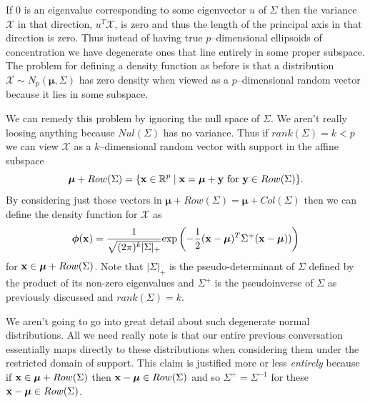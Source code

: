 \documentclass{book}
\newcommand{\bs}[1]{\boldsymbol{#1}}
\newcommand{\rv}[1]{\bs{\mathscr{#1}}}
\begin{document}
If $0$ is an eigenvalue corresponding to some eigenvector $u$ of $\Sigma$ then the variance $\rv{X}$ in that direction, $u^T\rv{X}$, is zero and thus the length of the principal axis in that direction is zero. Thus instead of having true $p$--dimensional ellipsoids of concentration we have degenerate ones that line entirely in some proper subspace. The problem for defining a density function as before is that a distribution $\rv{X}\sim N_p(\bs{\mu},\Sigma)$ has zero density when viewed as a $p$--dimensional random vector because it lies in some subspace.

We can remedy this problem by ignoring the null space of $\Sigma$. We aren't really loosing anything because $Nul(\Sigma)$ has no variance. Thus if $rank(\Sigma)=k<p$ we can view $\rv{X}$ as a $k$--dimensional random vector with support in the affine subspace 
$$
\bs{\mu}+Row(\Sigma)=\{{\bf x}\in\mathbb{R}^p \mid {\bf x}=\bs{\mu}+{\bf y}\text{ for }{\bf y}\in Row(\Sigma)\}.
$$
By considering just those vectors in $\bs{\mu}+Row(\Sigma)=\bs{\mu}+Col(\Sigma)$ then we can define the density function for $\rv{X}$ as
$$
\bs{\phi}({\bf x})=\frac{1}{\sqrt{(2\pi)^k|\Sigma|_+}}\text{exp}\left(-\frac{1}{2}({\bf x}-\bs{\mu})^T\Sigma^+({\bf x}-\bs{\mu}))\right)
$$
for ${\bf x}\in\bs{\mu}+Row(\Sigma)$. Note that $|\Sigma|_+$ is the pseudo-determinant of $\Sigma$ defined by the product of its non-zero eigenvalues and $\Sigma^+$ is the pseudoinverse of $\Sigma$ as previously discussed and $rank(\Sigma)=k$.

We aren't going to go into great detail about such degenerate normal distributions. All we need really note is that our entire previous conversation essentially maps directly to these distributions when considering them under the restricted domain of support. This claim is justified more or less \emph{entirely} because if ${\bf x}\in\bs{\mu}+Row(\Sigma)$ then ${\bf x}-\bs{\mu}\in Row(\Sigma)$ and so $\Sigma^+=\Sigma^{-1}$ for these ${\bf x}-\bs{\mu}\in Row(\Sigma)$. 


\end{document}
